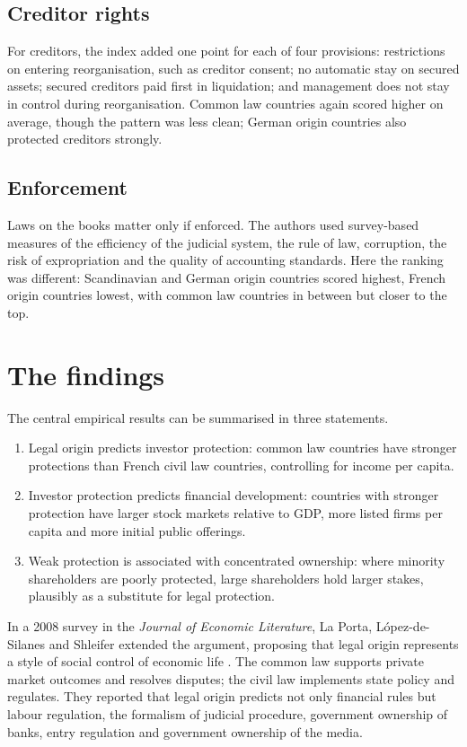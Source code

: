 \subsection{Creditor rights}

For creditors, the index added one point for each of four provisions: restrictions on entering reorganisation, such as creditor consent; no automatic stay on secured assets; secured creditors paid first in liquidation; and management does not stay in control during reorganisation. Common law countries again scored higher on average, though the pattern was less clean; German origin countries also protected creditors strongly.

\subsection{Enforcement}

Laws on the books matter only if enforced. The authors used survey-based measures of the efficiency of the judicial system, the rule of law, corruption, the risk of expropriation and the quality of accounting standards. Here the ranking was different: Scandinavian and German origin countries scored highest, French origin countries lowest, with common law countries in between but closer to the top.

\section{The findings}

The central empirical results can be summarised in three statements.
\begin{enumerate}[label=(\roman*)]
\item Legal origin predicts investor protection: common law countries have stronger protections than French civil law countries, controlling for income per capita.
\item Investor protection predicts financial development: countries with stronger protection have larger stock markets relative to GDP, more listed firms per capita and more initial public offerings.
\item Weak protection is associated with concentrated ownership: where minority shareholders are poorly protected, large shareholders hold larger stakes, plausibly as a substitute for legal protection.
\end{enumerate}
In a 2008 survey in the \emph{Journal of Economic Literature}, La Porta, L\'opez-de-Silanes and Shleifer extended the argument, proposing that legal origin represents a style of social control of economic life \citep{lls2008}. The common law supports private market outcomes and resolves disputes; the civil law implements state policy and regulates. They reported that legal origin predicts not only financial rules but labour regulation, the formalism of judicial procedure, government ownership of banks, entry regulation and government ownership of the media.

